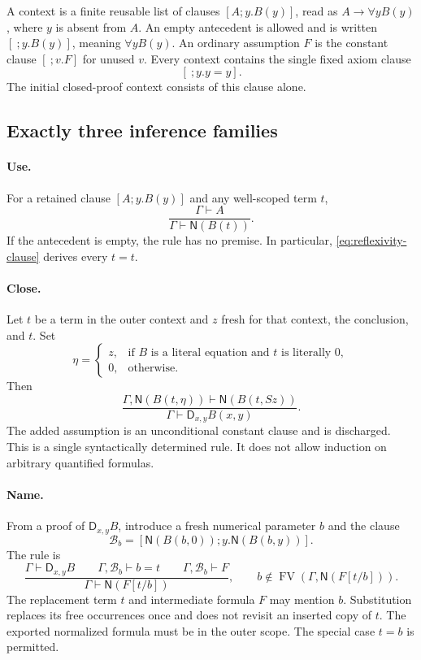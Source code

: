 \documentclass[11pt,letterpaper]{article}
\theoremstyle{definition}\newtheorem{definition}[theorem]{Definition}
\theoremstyle{remark}\newtheorem{remark}[theorem]{Remark}
\newcommand{\NF}{\mathsf N}
\newcommand{\DD}{\mathsf D}
\newcommand{\FV}{\operatorname{FV}}
\begin{document}
A context is a finite reusable list of clauses $[A;y.B(y)]$, read as
$A\to\forall yB(y)$, where $y$ is absent from $A$. An empty antecedent
is allowed and is written $[\ ;y.B(y)]$, meaning $\forall yB(y)$.
An ordinary assumption $F$ is the constant clause $[\ ;v.F]$ for unused
$v$. Every context contains the single fixed axiom clause
\begin{equation}\label{eq:reflexivity-clause}
                    [\ ;y.y=y].
\end{equation}
The initial closed-proof context consists of this clause alone.

\subsection{Exactly three inference families}

\paragraph{Use.}
For a retained clause $[A;y.B(y)]$ and any well-scoped term $t$,
\[
 \frac{\Gamma\vdash A}{\Gamma\vdash\NF(B(t))}.
\]
If the antecedent is empty, the rule has no premise. In particular,
\eqref{eq:reflexivity-clause} derives every $t=t$.

\paragraph{Close.}
Let $t$ be a term in the outer context and $z$ fresh for that context,
the conclusion, and $t$. Set
\[
 \eta=\begin{cases}
 z,&\text{if $B$ is a literal equation and $t$ is literally $0$},\\
 0,&\text{otherwise}.
 \end{cases}
\]
Then
\begin{equation}\label{eq:close}
 \frac{\Gamma,\NF(B(t,\eta))\vdash\NF(B(t,Sz))}
      {\Gamma\vdash\DD_{x,y}B(x,y)}.
\end{equation}
The added assumption is an unconditional constant clause and is
discharged. This is a single syntactically determined rule. It does
not allow induction on arbitrary quantified formulas.

\paragraph{Name.}
From a proof of $\DD_{x,y}B$, introduce a fresh numerical parameter $b$
and the clause
\[
 \mathcal B_b=[\NF(B(b,0));y.\NF(B(b,y))].
\]
The rule is
\begin{equation}\label{eq:name}
 \frac{\Gamma\vdash\DD_{x,y}B\qquad
       \Gamma,\mathcal B_b\vdash b=t\qquad
       \Gamma,\mathcal B_b\vdash F}
      {\Gamma\vdash\NF(F[t/b])},
 \qquad b\notin\FV(\Gamma,\NF(F[t/b])).
\end{equation}
The replacement term $t$ and intermediate formula $F$ may mention $b$.
Substitution replaces its free occurrences once and does not revisit
an inserted copy of $t$. The exported normalized formula must be in
the outer scope. The special case $t=b$ is permitted.
\end{document}
